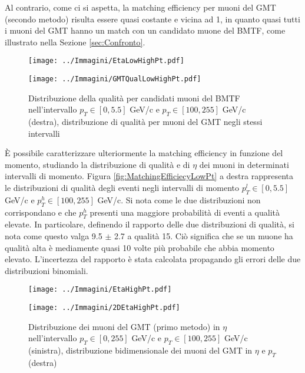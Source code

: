 Al contrario, come ci si aspetta, la matching efficiency per muoni del GMT (secondo metodo) risulta essere quasi costante e vicina ad 1, in quanto quasi tutti i muoni del GMT hanno un match con un candidato muone del BMTF, come illustrato nella Sezione \ref{sec:Confronto}. 


\begin{figure}[t]
  \centering
  \begin{minipage}[b]{0.45\textwidth}
    \centering
    \texttt{[image: ../Immagini/EtaLowHighPt.pdf]} 
    \end{minipage}
    \hfill 
    \begin{minipage}[b]{0.45\textwidth}
      \centering
      \texttt{[image: ../Immagini/GMTQualLowHighPt.pdf]} 
    \end{minipage}
    \caption{Distribuzione della qualità per candidati muoni del BMTF nell'intervallo $p_T \in [0, 5.5]$ GeV/c e $p_T \in [100, 255]$ GeV/c (destra), distribuzione di qualità per muoni del GMT negli stessi intervalli}
  \label{fig:QualEtaLowHighPt}
\end{figure}

È possibile caratterizzare ulteriormente la matching efficiency in funzione del momento, studiando la distribuzione di qualità e di $\eta$ dei muoni in determinati intervalli di momento. Figura \ref{fig:MatchingEfficiecyLowPt} a destra rappresenta le distribuzioni di qualità degli eventi negli intervalli di momento $p_T^l \in [0, 5.5]$ GeV/c e $p_T^h \in [100, 255]$ GeV/c. Si nota come le due distribuzioni non corrispondano e che $p_T^h$ presenti una maggiore probabilità di eventi a qualità elevate. In particolare, definendo il rapporto delle due distribuzioni di qualità, si nota come questo valga 9.5 $\pm$ 2.7 a qualità 15. Ciò significa che se un muone ha qualità alta è mediamente quasi 10 volte più probabile che abbia momento elevato. L'incertezza del rapporto è stata calcolata propagando gli errori delle due distribuzioni binomiali.

\begin{figure}[b]
  \centering
  \begin{minipage}[b]{0.47\textwidth}
    \centering
    \texttt{[image: ../Immagini/EtaHighPt.pdf]} 
    \end{minipage}
    \hfill 
    \begin{minipage}[b]{0.51\textwidth}
      \centering
      \texttt{[image: ../Immagini/2DEtaHighPt.pdf]}
    \end{minipage}
    \caption{Distribuzione dei muoni del GMT (primo metodo) in $\eta$  nell'intervallo $p_T \in [0, 255]$ GeV/c e $p_T \in [100, 255]$ GeV/c (sinistra), distribuzione bidimensionale dei muoni del GMT in $\eta$ e $p_T$ (destra)}
  \label{fig:MatchingEfficiecyPt2}
\end{figure}

